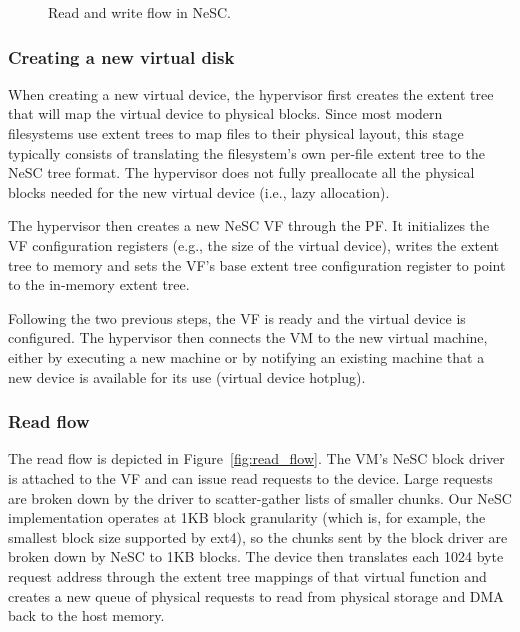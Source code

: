 \begin{figure}[t]
{%
    \label{fig:write_flow}
  }
  \caption{Read and write flow in NeSC.\label{fig:flow}}
\end{figure}

\subsubsection*{Creating a new virtual disk}

When creating a new virtual device, the hypervisor first creates the extent tree that will map the virtual device to physical blocks.  
Since most modern filesystems use extent trees to map files to their physical layout, this stage typically consists of translating the filesystem's own per-file extent tree to the NeSC tree format. The hypervisor does not fully preallocate all the physical blocks needed for the new virtual device (i.e., lazy allocation). 

The hypervisor then creates a new NeSC VF through the PF. It initializes the VF configuration registers (e.g., the size of the virtual device), writes the extent tree to memory and sets the VF's base extent tree configuration register to point to the in-memory extent tree.

Following the two previous steps, the VF is ready and the virtual device is configured. The hypervisor then connects the VM to the new virtual machine, either by executing a new machine or by notifying an existing machine that a new device is available for its use (virtual device hotplug).

\subsubsection*{Read flow}
The read flow is depicted in Figure~\ref{fig:read_flow}. The VM's NeSC block driver is attached to the VF and can issue read requests to the device. Large requests are broken down by the driver to scatter-gather lists of smaller chunks. Our NeSC implementation operates at 1KB block granularity (which is, for example, the smallest block size supported by ext4), so the chunks sent by the block driver are broken down by NeSC to 1KB blocks.
The device then translates each 1024 byte request address through the extent tree mappings of
that virtual function and creates a new queue of physical requests to read from physical storage
and DMA back to the host memory.

